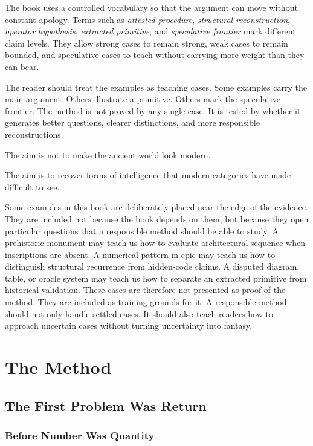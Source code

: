 \documentclass[11pt]{book}
\begin{document}
The book uses a controlled vocabulary so that the argument can move without constant apology. Terms such as \emph{attested procedure}, \emph{structural reconstruction}, \emph{operator hypothesis}, \emph{extracted primitive}, and \emph{speculative frontier} mark different claim levels. They allow strong cases to remain strong, weak cases to remain bounded, and speculative cases to teach without carrying more weight than they can bear.

The reader should treat the examples as teaching cases. Some examples carry the main argument. Others illustrate a primitive. Others mark the speculative frontier. The method is not proved by any single case. It is tested by whether it generates better questions, clearer distinctions, and more responsible reconstructions.

The aim is not to make the ancient world look modern.

The aim is to recover forms of intelligence that modern categories have made difficult to see.

Some examples in this book are deliberately placed near the edge of the evidence. They are included not because the book depends on them, but because they open particular questions that a responsible method should be able to study. A prehistoric monument may teach us how to evaluate architectural sequence when inscriptions are absent. A numerical pattern in epic may teach us how to distinguish structural recurrence from hidden-code claims. A disputed diagram, table, or oracle system may teach us how to separate an extracted primitive from historical validation. These cases are therefore not presented as proof of the method. They are included as training grounds for it. A responsible method should not only handle settled cases. It should also teach readers how to approach uncertain cases without turning uncertainty into fantasy.

\tableofcontents

\mainmatter

\part{The Method}

\chapter{The First Problem Was Return}

\section{Before Number Was Quantity}
\end{document}
